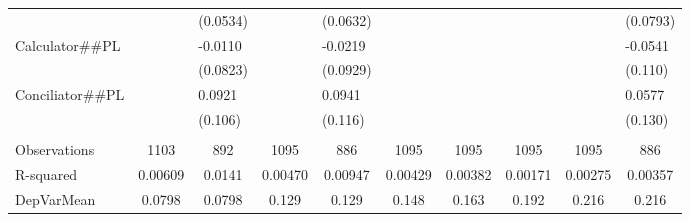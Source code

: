 \begin{tabular}{rrrrrrrrrr}
\multicolumn{1}{l}{} & \multicolumn{1}{l}{} & \multicolumn{1}{l}{(0.0534)} & \multicolumn{1}{l}{} & \multicolumn{1}{l}{(0.0632)} & \multicolumn{1}{l}{} & \multicolumn{1}{l}{} & \multicolumn{1}{l}{} & \multicolumn{1}{l}{} & \multicolumn{1}{l}{(0.0793)} \\
\multicolumn{1}{l}{Calculator\#\#PL} & \multicolumn{1}{l}{} & \multicolumn{1}{l}{-0.0110} & \multicolumn{1}{l}{} & \multicolumn{1}{l}{-0.0219} & \multicolumn{1}{l}{} & \multicolumn{1}{l}{} & \multicolumn{1}{l}{} & \multicolumn{1}{l}{} & \multicolumn{1}{l}{-0.0541} \\
\multicolumn{1}{l}{} & \multicolumn{1}{l}{} & \multicolumn{1}{l}{(0.0823)} & \multicolumn{1}{l}{} & \multicolumn{1}{l}{(0.0929)} & \multicolumn{1}{l}{} & \multicolumn{1}{l}{} & \multicolumn{1}{l}{} & \multicolumn{1}{l}{} & \multicolumn{1}{l}{(0.110)} \\
\multicolumn{1}{l}{Conciliator\#\#PL} & \multicolumn{1}{l}{} & \multicolumn{1}{l}{0.0921} & \multicolumn{1}{l}{} & \multicolumn{1}{l}{0.0941} & \multicolumn{1}{l}{} & \multicolumn{1}{l}{} & \multicolumn{1}{l}{} & \multicolumn{1}{l}{} & \multicolumn{1}{l}{0.0577} \\
\multicolumn{1}{l}{} & \multicolumn{1}{l}{} & \multicolumn{1}{l}{(0.106)} & \multicolumn{1}{l}{} & \multicolumn{1}{l}{(0.116)} & \multicolumn{1}{l}{} & \multicolumn{1}{l}{} & \multicolumn{1}{l}{} & \multicolumn{1}{l}{} & \multicolumn{1}{l}{(0.130)} \\
\multicolumn{1}{l}{} & \multicolumn{1}{l}{} & \multicolumn{1}{l}{} & \multicolumn{1}{l}{} & \multicolumn{1}{l}{} & \multicolumn{1}{l}{} & \multicolumn{1}{l}{} & \multicolumn{1}{l}{} & \multicolumn{1}{l}{} & \multicolumn{1}{l}{} \\
\midrule
\multicolumn{1}{l}{Observations} & \multicolumn{1}{c}{1103} & \multicolumn{1}{c}{892} & \multicolumn{1}{c}{1095} & \multicolumn{1}{c}{886} & \multicolumn{1}{c}{1095} & \multicolumn{1}{c}{1095} & \multicolumn{1}{c}{1095} & \multicolumn{1}{c}{1095} & \multicolumn{1}{c}{886} \\
\multicolumn{1}{l}{R-squared} & \multicolumn{1}{c}{0.00609} & \multicolumn{1}{c}{0.0141} & \multicolumn{1}{c}{0.00470} & \multicolumn{1}{c}{0.00947} & \multicolumn{1}{c}{0.00429} & \multicolumn{1}{c}{0.00382} & \multicolumn{1}{c}{0.00171} & \multicolumn{1}{c}{0.00275} & \multicolumn{1}{c}{0.00357} \\
\multicolumn{1}{l}{DepVarMean} & \multicolumn{1}{c}{0.0798} & \multicolumn{1}{c}{0.0798} & \multicolumn{1}{c}{0.129} & \multicolumn{1}{c}{0.129} & \multicolumn{1}{c}{0.148} & \multicolumn{1}{c}{0.163} & \multicolumn{1}{c}{0.192} & \multicolumn{1}{c}{0.216} & \multicolumn{1}{c}{0.216} \\

\end{tabular}
